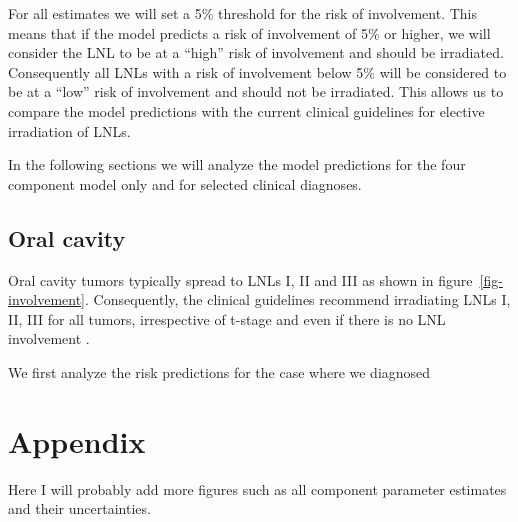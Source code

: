 \documentclass[
  sn-mathphys-num,
]{sn-jnl}
\begin{document}
For all estimates we will set a 5\% threshold for the risk of
involvement. This means that if the model predicts a risk of involvement
of 5\% or higher, we will consider the LNL to be at a ``high'' risk of
involvement and should be irradiated. Consequently all LNLs with a risk
of involvement below 5\% will be considered to be at a ``low'' risk of
involvement and should not be irradiated. This allows us to compare the
model predictions with the current clinical guidelines for elective
irradiation of LNLs.

In the following sections we will analyze the model predictions for the
four component model only and for selected clinical diagnoses.

\subsection{Oral cavity}\label{oral-cavity}

Oral cavity tumors typically spread to LNLs I, II and III as shown in
figure~\ref{fig-involvement}. Consequently, the clinical guidelines
recommend irradiating LNLs I, II, III for all tumors, irrespective of
t-stage and even if there is no LNL involvement
\citep{biau_selection_2019}.

We first analyze the risk predictions for the case where we diagnosed

\section{Appendix}\label{appendix}

Here I will probably add more figures such as all component parameter
estimates and their uncertainties.


  
\end{document}
